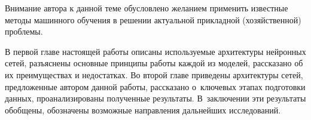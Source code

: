 Внимание автора к данной теме обусловлено желанием применить известные методы машинного обучения в решении актуальной прикладной (хозяйственной) проблемы.

В первой главе настоящей работы описаны используемые архитектуры нейронных сетей,
разъяснены основные принципы работы каждой из моделей, рассказано об их преимуществах и недостатках.
Во второй главе приведены архитектуры сетей, предложенные автором данной работы, 
рассказано о~ключевых этапах подготовки данных, проанализированы полученные результаты.
В~заключении эти результаты обобщены, обозначены возможные направления дальнейших исследований.
